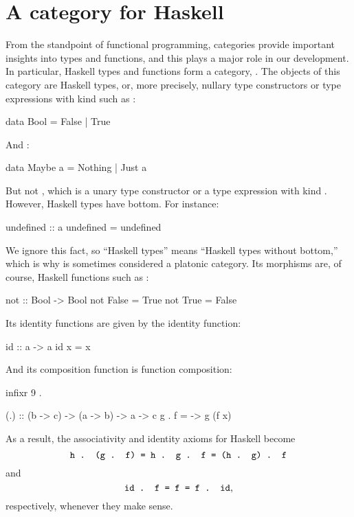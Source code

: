 \section{A category for Haskell}
\label{sec:category-haskell}

From the standpoint of functional programming, categories provide
important insights into types and functions, and this plays a major
role in our development. In particular, Haskell types and functions
form a category, \hask. The objects of this category are Haskell
types, or, more precisely, nullary type constructors or type
expressions with kind \texthaskell{*} such as :
\begin{codehaskell}
data Bool = False | True
\end{codehaskell}
And :
\begin{codehaskell}
data Maybe a = Nothing | Just a
\end{codehaskell}
But not , which is a unary type constructor or a
type expression with kind \texthaskell{* -> *}. However, Haskell types
have bottom. For instance:
\begin{codehaskell}
undefined :: a
undefined = undefined
\end{codehaskell}
We ignore this fact, so ``Haskell types'' means ``Haskell types
without bottom,'' which is why \hask is sometimes considered a
platonic category. Its morphisms are, of course, Haskell functions
such as :
\begin{codehaskell}
not :: Bool -> Bool
not False = True
not True  = False
\end{codehaskell}
Its identity functions are given by the identity function:
\begin{codehaskell}
id :: a -> a
id x = x
\end{codehaskell}
And its composition function is function composition:
\begin{codehaskell}
infixr 9 .

(.) :: (b -> c) -> (a -> b) -> a -> c
g . f = \x -> g (f x)
\end{codehaskell}
As a result, the associativity and identity axioms for Haskell become
\begin{equation}
  \label{eq:hask-associativity}
  \text{\texttt{h . (g . f) = h . g . f = (h . g) . f}}
\end{equation}
and
\begin{equation}
  \label{eq:hask-identity}
  \text{\texttt{id . f = f = f . id}}
  \text{,}
\end{equation}
respectively, whenever they make sense.

